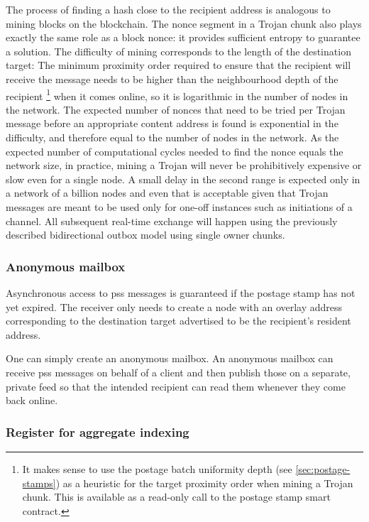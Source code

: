 The process of finding a hash close to the recipient address is analogous to mining blocks on the blockchain. The nonce segment in a Trojan chunk also plays exactly the same role as a block nonce: it provides sufficient entropy to guarantee a solution. The difficulty of mining corresponds to the length of the destination target: The minimum proximity order required to ensure that the recipient will receive the message needs to be higher than the neighbourhood depth of the recipient%
%
\footnote{It makes sense to use the postage batch uniformity depth (see \ref{sec:postage-stamps}) as a heuristic for the target proximity order when mining a Trojan chunk. This is available as a read-only call to the postage stamp smart contract.}
%
when it comes online, so it is logarithmic in the number of nodes in the network. The expected number of nonces that need to be tried per Trojan message before an appropriate content address is found is exponential in the difficulty, and therefore equal to the number of nodes in the network. As the expected number of computational cycles needed to find the nonce equals the network size, in practice, mining a Trojan will never be prohibitively expensive or slow even for a single node. A small delay in the second range is expected only in a network of a billion nodes and even that is acceptable given that Trojan messages are meant to be used only for one-off instances such as initiations of a channel. All subsequent real-time exchange will happen using the previously described bidirectional outbox model using single owner chunks.


\subsubsection{Anonymous mailbox}

Asynchronous access to pss messages is guaranteed if the postage stamp has not yet expired. The receiver only needs to create a node with an overlay address corresponding to the destination target advertised to be the recipient's resident address.    

One can simply create an anonymous mailbox. An anonymous mailbox can receive pss messages on behalf of a client and then publish those on a separate, private feed so that the intended recipient can read them whenever they come back online.

\subsubsection{Register for aggregate indexing}

